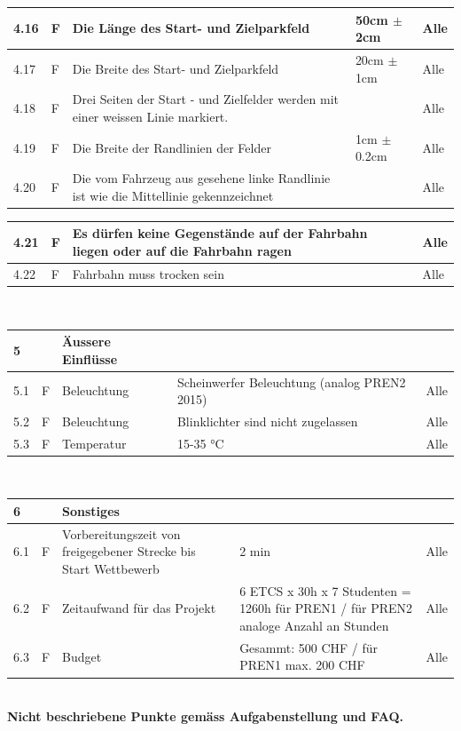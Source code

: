 \begin{center}
\begin{tabular}{|p{1cm}|p{0.5cm}|p{5cm}|p{5cm}|p{1.5cm}|}
 4.16 & F & Die Länge des Start- und Zielparkfeld & 50cm $\pm$ 2cm & Alle\\ \hline
 4.17 & F & Die Breite des Start- und Zielparkfeld & 20cm $\pm$ 1cm & Alle\\ \hline
 4.18 & F & Drei Seiten der Start - und Zielfelder werden mit einer weissen Linie markiert. & & Alle\\ \hline
 4.19 & F & Die Breite der Randlinien der Felder & 1cm $\pm$ 0.2cm & Alle\\ \hline
 4.20 & F & Die vom Fahrzeug aus gesehene linke Randlinie ist wie die Mittellinie gekennzeichnet & & Alle\\\hline
 \end{tabular}
 \newpage
\begin{tabular}{|p{1cm}|p{0.5cm}|p{5cm}|p{5cm}|p{1.5cm}|}\hline
 4.21 & F & Es dürfen keine Gegenstände auf der Fahrbahn liegen oder auf die Fahrbahn ragen & & Alle\\\hline
 4.22 & F & Fahrbahn muss trocken sein & & Alle \\\hline
\end{tabular}\\[0.3cm]
\begin{tabular}{|p{1cm}|p{0.5cm}|p{5cm}|p{5cm}|p{1.5cm}|}\hline
 \textbf{5} & & \textbf{Äussere Einflüsse} & & \\\hline
 5.1 & F & Beleuchtung & Scheinwerfer Beleuchtung (analog PREN2 2015) & Alle\\\hline
 5.2 & F & Beleuchtung & Blinklichter sind nicht zugelassen & Alle\\\hline
 5.3 & F & Temperatur & 15-35 °C & Alle \\\hline
 \end{tabular}\\[0.3cm]
 \begin{tabular}{|p{1cm}|p{0.5cm}|p{5cm}|p{5cm}|p{1.5cm}|}\hline
 \textbf{6} & & \textbf{Sonstiges} & & \\\hline
 6.1 & F & Vorbereitungszeit von freigegebener Strecke bis Start Wettbewerb & 2 min & Alle \\\hline
 6.2 & F & Zeitaufwand für das Projekt & 6 ETCS x 30h x 7 Studenten = 1260h für PREN1 / für PREN2 analoge Anzahl an Stunden & Alle \\\hline
 6.3 & F & Budget & Gesammt: 500 CHF / für PREN1 max. 200 CHF & Alle \\\hline
 \end{tabular}\\[0.3cm]
 \textbf{Nicht beschriebene Punkte gemäss Aufgabenstellung und FAQ.}
\end{center}

